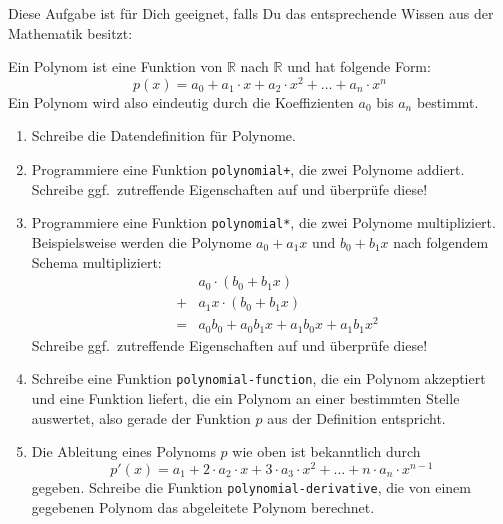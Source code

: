 \begin{aufgabe}
  Diese Aufgabe ist für Dich geeignet, falls Du das entsprechende
  Wissen aus der Mathematik besitzt:

  Ein Polynom ist eine Funktion von $\mathbb{R}$ nach $\mathbb{R}$ und
  hat folgende Form:
  \begin{displaymath}
    p(x) = a_0 +
    a_1 \cdot x + a_2 \cdot x^2 + \ldots + a_n \cdot x^n    
  \end{displaymath}
  Ein Polynom wird also eindeutig durch die Koeffizienten $a_0$ bis
  $a_n$ bestimmt.

  \begin{enumerate}
   \item Schreibe die Datendefinition für Polynome.
   \item Programmiere eine Funktion \lstinline{polynomial+}, die
     zwei Polynome addiert.  Schreibe ggf.\ zutreffende Eigenschaften auf
     und überprüfe diese!
     
   \item Programmiere eine Funktion \lstinline{polynomial*}, die zwei Polynome 
     multipliziert. 
     Beispielsweise werden die Polynome $a_0+a_1 x$ und $b_0+b_1 x$ nach folgendem Schema multipliziert:
     \begin{eqnarray*}
     & &a_0 \cdot (b_0+b_1x) \\
     &+&a_1 x \cdot (b_0+b_1 x) \\ 
     &=&a_0b_0+a_0b_1 x + a_1b_0x + a_1b_1x^2
     \end{eqnarray*}	
     Schreibe ggf.\ zutreffende Eigenschaften auf und überprüfe diese!
   \item Schreibe eine Funktion \lstinline{polynomial-function}, die
     ein Polynom akzeptiert und eine Funktion liefert, die ein Polynom
     an einer bestimmten Stelle auswertet, also gerade der Funktion
     $p$ aus der Definition entspricht. 
   \item Die Ableitung eines Polynoms $p$ wie oben ist bekanntlich durch
     \begin{displaymath}
       p'(x) = a_1 + 2\cdot a_2 \cdot x + 3\cdot a_3\cdot x^2 + \ldots
       + n \cdot a_n \cdot x^{n-1}
     \end{displaymath}
     gegeben. Schreibe die Funktion
     \lstinline{polynomial-derivative}, die von einem gegebenen Polynom das abgeleitete Polynom
     berechnet.
 \end{enumerate}
\end{aufgabe}

